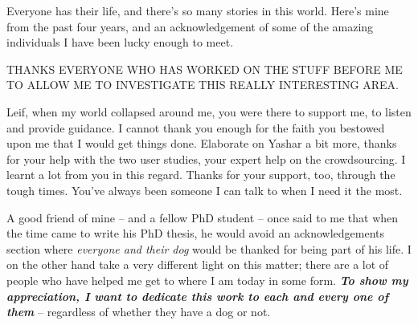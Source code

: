 \begin{preamble}


Everyone has their life, and there's so many stories in this world. Here's mine from the past four years, and an acknowledgement of some of the amazing individuals I have been lucky enough to meet.

THANKS EVERYONE WHO HAS WORKED ON THE STUFF BEFORE ME TO ALLOW ME TO INVESTIGATE THIS REALLY INTERESTING AREA.

Leif, when my world collapsed around me, you were there to support me, to listen and provide guidance. I cannot thank you enough for the faith you bestowed upon me that I would get things done. Elaborate on Yashar a bit more, thanks for your help with the two user studies, your expert help on the crowdsourcing. I learnt a lot from you in this regard. Thanks for your support, too, through the tough times. You've always been someone I can talk to when I need it the most.




A good friend of mine -- and a fellow PhD student -- once said to me that when the time came to write his PhD thesis, he would avoid an acknowledgements section where \emph{everyone and their dog} would be thanked for being part of his life. I on the other hand take a very different light on this matter; there are a lot of people who have helped me get to where I am today in some form. \textbf{\emph{To show my appreciation, I want to dedicate this work to each and every one of them}} -- regardless of whether they have a dog or not.


\end{preamble}
